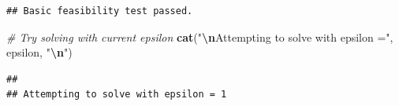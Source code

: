 \documentclass[
]{article}
\newenvironment{Shaded}{\begin{snugshade}}{\end{snugshade}}
\newcommand{\CommentTok}[1]{\textcolor[rgb]{0.56,0.35,0.01}{\textit{#1}}}
\newcommand{\FunctionTok}[1]{\textcolor[rgb]{0.13,0.29,0.53}{\textbf{#1}}}
\newcommand{\NormalTok}[1]{#1}
\newcommand{\SpecialCharTok}[1]{\textcolor[rgb]{0.81,0.36,0.00}{\textbf{#1}}}
\newcommand{\StringTok}[1]{\textcolor[rgb]{0.31,0.60,0.02}{#1}}
\begin{document}
\begin{verbatim}
## Basic feasibility test passed.
\end{verbatim}

\begin{Shaded}
\begin{Highlighting}[]
\CommentTok{\# Try solving with current epsilon}
\FunctionTok{cat}\NormalTok{(}\StringTok{"}\SpecialCharTok{\textbackslash{}n}\StringTok{Attempting to solve with epsilon ="}\NormalTok{, epsilon, }\StringTok{"}\SpecialCharTok{\textbackslash{}n}\StringTok{"}\NormalTok{)}
\end{Highlighting}
\end{Shaded}

\begin{verbatim}
## 
## Attempting to solve with epsilon = 1
\end{verbatim}
\end{document}
